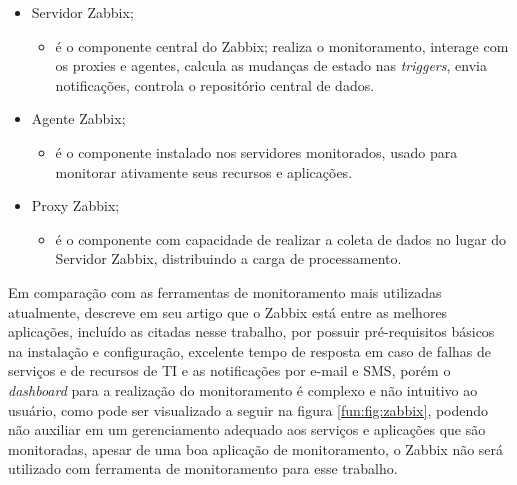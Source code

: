\begin{enumerate}
\begin{itemize}
\item Servidor Zabbix;
    \begin{itemize}
        \item é o componente central do Zabbix; realiza o monitoramento, interage com os proxies e agentes, calcula as mudanças de estado nas \textit{triggers}, envia notificações, controla o repositório central de dados.
    \end{itemize}
\item Agente Zabbix;
\begin{itemize}
        \item é o componente instalado nos servidores monitorados, usado para monitorar ativamente seus recursos e aplicações.
    \end{itemize}
\item Proxy Zabbix;
\begin{itemize}
        \item é o componente com capacidade de realizar a coleta de dados no lugar do Servidor Zabbix, distribuindo a carga de processamento.
    \end{itemize}
\end{itemize}

Em comparação com as ferramentas de monitoramento mais utilizadas atualmente, \cite{marik2014comparative} descreve em seu artigo que o Zabbix está entre as melhores aplicações, incluído as citadas nesse trabalho, por possuir pré-requisitos básicos na instalação e configuração, excelente tempo de resposta em caso de falhas de serviços e de recursos de \acrshort{TI} e as notificações por e-mail e \acrshort{SMS}, porém o \textit{dashboard} para a realização do monitoramento é complexo e não intuitivo ao usuário, como pode ser visualizado a seguir na figura \ref{fun:fig:zabbix}, podendo não auxiliar em um gerenciamento adequado aos serviços e aplicações que são monitoradas, apesar de uma boa aplicação de monitoramento, o Zabbix não será utilizado com ferramenta de monitoramento para esse trabalho.    


\end{enumerate}
